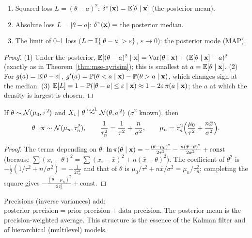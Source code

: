 \documentclass[main.tex]{subfiles}
\begin{document}
\begin{theorem}\label{thm:bayes-tahmin}
\begin{enumerate}
  \item Squared loss $L=(\theta-a)^2$: $\delta^\pi(\mathbf{x})=\mathbb{E}[\theta\mid\mathbf{x}]$ (the posterior mean).
  \item Absolute loss $L=|\theta-a|$: $\delta^\pi(\mathbf{x})=$ the posterior median.
  \item The limit of 0--1 loss ($L=\I\{|\theta-a|>\varepsilon\}$, $\varepsilon\to0$): the posterior mode (MAP).
\end{enumerate}
\end{theorem}
\begin{proof}
(1) Under the posterior, $\mathbb{E}[(\theta-a)^2\mid\mathbf{x}]=\operatorname{Var}(\theta\mid\mathbf{x})+(\mathbb{E}[\theta\mid\mathbf{x}]-a)^2$ (exactly as in Theorem~\ref{thm:mse-ayrisim}); this is smallest at $a=\mathbb{E}[\theta\mid\mathbf{x}]$.
(2) For $g(a)=\mathbb{E}|\theta-a|$, $g'(a)=\mathbb{P}(\theta<a\mid\mathbf{x})-\mathbb{P}(\theta>a\mid\mathbf{x})$, which changes sign at the median.
(3) $\mathbb{E}[L]=1-\mathbb{P}(|\theta-a|\le\varepsilon\mid\mathbf{x})\approx1-2\varepsilon\,\pi(a\mid\mathbf{x})$; the $a$ at which the density is largest is chosen.
\end{proof}

\begin{theorem}\label{thm:normal-normal}
If $\theta\sim\mathcal{N}(\mu_0,\tau^2)$ and $X_i\mid\theta\overset{\text{i.i.d.}}{\sim}\mathcal{N}(\theta,\sigma^2)$ ($\sigma^2$ known), then
\[
\theta\mid\mathbf{x}\sim\mathcal{N}(\mu_n,\tau_n^2),\qquad\frac{1}{\tau_n^2}=\frac1{\tau^2}+\frac{n}{\sigma^2},\qquad\mu_n=\tau_n^2\Big(\frac{\mu_0}{\tau^2}+\frac{n\bar x}{\sigma^2}\Big).
\]
\end{theorem}
\begin{proof}
The terms depending on $\theta$: $\ln\pi(\theta\mid\mathbf{x})=-\frac{(\theta-\mu_0)^2}{2\tau^2}-\frac{n(\bar x-\theta)^2}{2\sigma^2}+\text{const}$ (because $\sum(x_i-\theta)^2=\sum(x_i-\bar x)^2+n(\bar x-\theta)^2$). The coefficient of $\theta^2$ is $-\frac12(1/\tau^2+n/\sigma^2)=-\frac1{2\tau_n^2}$ and that of $\theta$ is $\mu_0/\tau^2+n\bar x/\sigma^2=\mu_n/\tau_n^2$; completing the square gives $-\frac{(\theta-\mu_n)^2}{2\tau_n^2}+\text{const}$.
\end{proof}

\begin{remark}
Precisions (inverse variances) add: $\text{posterior precision}=\text{prior precision}+\text{data precision}$. The posterior mean is the precision-weighted average. This structure is the essence of the Kalman filter and of hierarchical (multilevel) models.
\end{remark}
\end{document}
